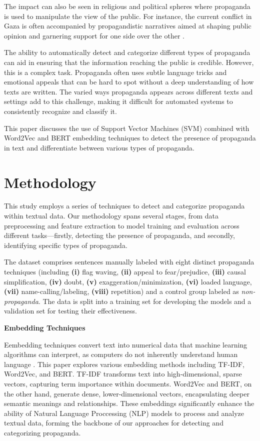\documentclass[twocolumn]{article}
\begin{document}
The impact can also be seen in religious and political spheres where propaganda is used to manipulate the view of the public. For instance, the current conflict in Gaza is often accompanied by propagandistic narratives aimed at shaping public opinion and garnering support for one side over the other .

The ability to automatically detect and categorize different types of propaganda can aid in ensuring that the information reaching the public is credible. However, this is a complex task. Propaganda often uses subtle language tricks and emotional appeals that can be hard to spot without a deep understanding of how texts are written. The varied ways propaganda appears across different texts and settings add to this challenge, making it difficult for automated systems to consistently recognize and classify it.

This paper discusses the use of Support Vector Machines (SVM) combined with Word2Vec and BERT embedding techniques to detect the presence of propaganda in text and differentiate between various types of propaganda.

\section{Methodology}
This study employs a series of techniques to detect and categorize propaganda within textual data. Our methodology spans several stages, from data preprocessing and feature extraction to model training and evaluation across different tasks—firstly, detecting the presence of propaganda, and secondly, identifying specific types of propaganda.

The dataset comprises sentences manually labeled with eight distinct propaganda techniques (including \textbf{(i)} flag waving, \textbf{(ii)} appeal to fear/prejudice, \textbf{(iii)} causal simplification, \textbf{(iv)} doubt, \textbf{(v)} exaggeration/minimization, \textbf{(vi)} loaded language, \textbf{(vii)} name-calling/labeling, \textbf{(viii)} repetition) and a control group labeled as \textit{non-propaganda}. The data is split into a training set for developing the models and a validation set for testing their effectiveness.

\textbf{Embedding Techniques}

Eembedding techniques convert text into numerical data that machine learning algorithms can interpret, as computers do not inherently understand human language . This paper explores various embedding methods including TF-IDF, Word2Vec, and BERT. TF-IDF transforms text into high-dimensional, sparse vectors, capturing term importance within documents. Word2Vec and BERT, on the other hand, generate dense, lower-dimensional vectors, encapsulating deeper semantic meanings and relationships. These embeddings significantly enhance the ability of Natural Language Proccessing (NLP) models to process and analyze textual data, forming the backbone of our approaches for detecting and categorizing propaganda.
\end{document}
